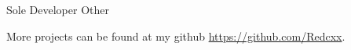 \begin{cventries}
  \cventry
    {Sole Developer} %
    {Other} %
    {} %
    {} %
    {
      \begin{cvitems} %
        \item {More projects can be found at my github \href{https://github.com/Redcxx}{https://github.com/Redcxx}.}
      \end{cvitems}
    }
  
    


\end{cventries}
